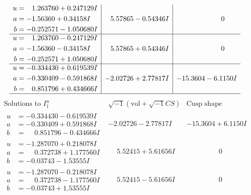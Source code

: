 \documentclass[1p]{elsarticle_modified}
\theoremstyle{definition}
\newcommand{\I}{\sqrt{-1}}
\begin{document}
$$\begin{array}{c|c|c}
\begin{aligned}
u &= \phantom{-}1.263760 + 0.247129 I \\
a &= -1.56360 + 0.34158 I \\
b &= -0.252571 - 1.050680 I\end{aligned}
 & \phantom{-}5.57865 - 0.54346 I & \phantom{-0.000000 } 0 \\ \hline\begin{aligned}
u &= \phantom{-}1.263760 - 0.247129 I \\
a &= -1.56360 - 0.34158 I \\
b &= -0.252571 + 1.050680 I\end{aligned}
 & \phantom{-}5.57865 + 0.54346 I & \phantom{-0.000000 } 0 \\ \hline\begin{aligned}
u &= -0.334430 + 0.619539 I \\
a &= -0.330409 - 0.591868 I \\
b &= \phantom{-}0.851796 + 0.434666 I\end{aligned}
 & -2.02726 + 2.77817 I & -15.3604 - 6.1150 I\\
 \hline 
 \end{array}$$\newpage$$\begin{array}{c|c|c}  
\text{Solutions to }I^u_{1}& \I (\text{vol} + \sqrt{-1}CS) & \text{Cusp shape}\\
 \hline 
\begin{aligned}
u &= -0.334430 - 0.619539 I \\
a &= -0.330409 + 0.591868 I \\
b &= \phantom{-}0.851796 - 0.434666 I\end{aligned}
 & -2.02726 - 2.77817 I & -15.3604 + 6.1150 I \\ \hline\begin{aligned}
u &= -1.287070 + 0.218078 I \\
a &= \phantom{-}0.372738 + 1.177560 I \\
b &= -0.03743 - 1.53555 I\end{aligned}
 & \phantom{-}5.52415 + 5.61656 I & \phantom{-0.000000 } 0 \\ \hline\begin{aligned}
u &= -1.287070 - 0.218078 I \\
a &= \phantom{-}0.372738 - 1.177560 I \\
b &= -0.03743 + 1.53555 I\end{aligned}
 & \phantom{-}5.52415 - 5.61656 I & \phantom{-0.000000 } 0 \\ \hline\begin{aligned}

\end{aligned}
\end{array}$$
\end{document}
